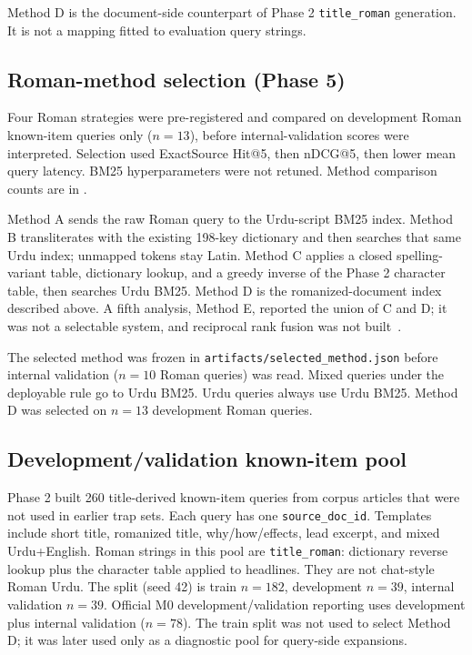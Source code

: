\documentclass[10pt,letterpaper]{article}
\begin{document}
Method D is the document-side counterpart of Phase 2 \texttt{title\_roman} generation. It is not a mapping fitted to evaluation query strings.

\subsection*{Roman-method selection (Phase 5)}

Four Roman strategies were pre-registered and compared on development Roman known-item queries only ($n = 13$), before internal-validation scores were interpreted. Selection used ExactSource Hit@5, then nDCG@5, then lower mean query latency. BM25 hyperparameters were not retuned. Method comparison counts are in .

Method A sends the raw Roman query to the Urdu-script BM25 index. Method B transliterates with the existing 198-key dictionary and then searches that same Urdu index; unmapped tokens stay Latin. Method C applies a closed spelling-variant table, dictionary lookup, and a greedy inverse of the Phase 2 character table, then searches Urdu BM25. Method D is the romanized-document index described above. A fifth analysis, Method E, reported the union of C and D; it was not a selectable system, and reciprocal rank fusion was not built~\cite{bib15}.

The selected method was frozen in \texttt{artifacts/selected\_method.json} before internal validation ($n = 10$ Roman queries) was read. Mixed queries under the deployable rule go to Urdu BM25. Urdu queries always use Urdu BM25. Method D was selected on $n = 13$ development Roman queries.

\subsection*{Development/validation known-item pool}

Phase 2 built 260 title-derived known-item queries from corpus articles that were not used in earlier trap sets. Each query has one \texttt{source\_doc\_id}. Templates include short title, romanized title, why/how/effects, lead excerpt, and mixed Urdu+English. Roman strings in this pool are \texttt{title\_roman}: dictionary reverse lookup plus the character table applied to headlines. They are not chat-style Roman Urdu. The split (seed 42) is train $n = 182$, development $n = 39$, internal validation $n = 39$. Official M0 development/validation reporting uses development plus internal validation ($n = 78$). The train split was not used to select Method D; it was later used only as a diagnostic pool for query-side expansions.
\end{document}

